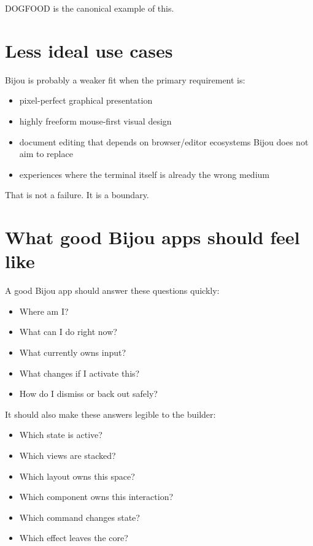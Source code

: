 DOGFOOD is the canonical example of this.

\section{Less ideal use cases}\label{record-035-less-ideal-use-cases}

Bijou is probably a weaker fit when the primary requirement is:

\begin{itemize}
\tightlist
\item
  pixel-perfect graphical presentation
\item
  highly freeform mouse-first visual design
\item
  document editing that depends on browser/editor ecosystems Bijou does not aim to replace
\item
  experiences where the terminal itself is already the wrong medium
\end{itemize}

That is not a failure. It is a boundary.

\section{What good Bijou apps should feel like}\label{record-035-what-good-bijou-apps-should-feel-like}

A good Bijou app should answer these questions quickly:

\begin{itemize}
\tightlist
\item
  Where am I?
\item
  What can I do right now?
\item
  What currently owns input?
\item
  What changes if I activate this?
\item
  How do I dismiss or back out safely?
\end{itemize}

It should also make these answers legible to the builder:

\begin{itemize}
\tightlist
\item
  Which state is active?
\item
  Which views are stacked?
\item
  Which layout owns this space?
\item
  Which component owns this interaction?
\item
  Which command changes state?
\item
  Which effect leaves the core?
\end{itemize}

